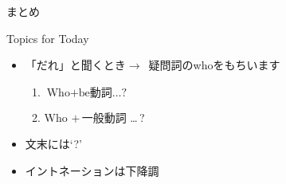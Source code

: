 \documentclass[aspectratio=169]{beamer}
\begin{document}
\begin{frame}[plain]{まとめ}
 
\begin{block}{Topics for Today}
\pause
\begin{itemize}\small
 \item 「だれ」と聞くとき$\longrightarrow$\,\,\,疑問詞のwhoをもちいます
        \begin{enumerate}
	 \item $\text{Who}+\text{be動詞\ldots ?}$
	 \item Who $+\,\text{一般動詞}$ \ldots\,?
	\end{enumerate}
 \item 文末には`?'
 \item イントネーションは下降調\,\myDownwardPitch{}\,\,
\end{itemize}
     \end{block}

\end{frame}
\end{document}
